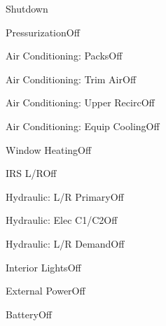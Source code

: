 \documentclass[sim-use]{checklist}
\begin{document}
\begin{checklist}{Shutdown}
  \item{Pressurization}{Off}
  \item{Air Conditioning: Packs}{Off}
  \item{Air Conditioning: Trim Air}{Off}
  \item{Air Conditioning: Upper Recirc}{Off}
  \item{Air Conditioning: Equip Cooling}{Off}
  \item{Window Heating}{Off}
  \item{IRS L/R}{Off}
  \item{Hydraulic: L/R Primary}{Off}
  \item{Hydraulic: Elec C1/C2}{Off}
  \item{Hydraulic: L/R Demand}{Off}
  \item{Interior Lights}{Off}
  \item{External Power}{Off}
  \item{Battery}{Off}
\end{checklist}
\end{document}
